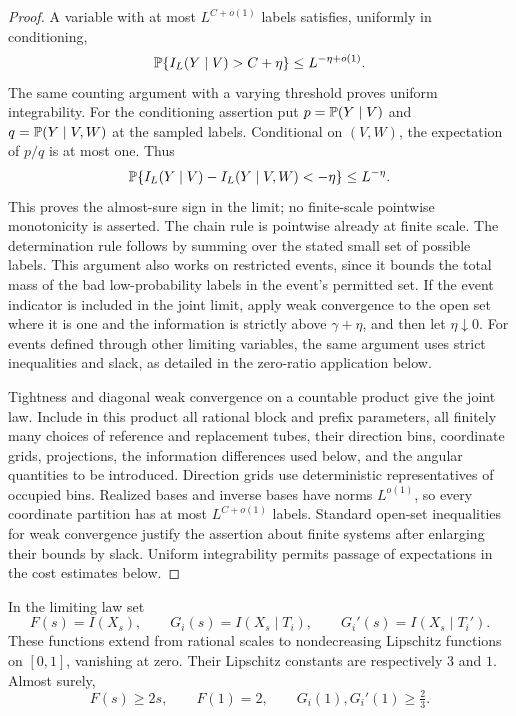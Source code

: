 \begin{proof}
A variable with at most $L^{C+o(1)}$ labels satisfies, uniformly in
conditioning,
\[
 \mathbb P\{I_L(Y\mid V)>C+\eta\}\le L^{-\eta+o(1)}.
\]
The same counting argument with a varying threshold proves uniform
integrability.  For the conditioning assertion put
$p=\mathbb P(Y\mid V)$ and $q=\mathbb P(Y\mid V,W)$ at the sampled labels.
Conditional on $(V,W)$, the expectation of $p/q$ is at most one.
Thus
\[
 \mathbb P\{I_L(Y\mid V)-I_L(Y\mid V,W)<-\eta\}
       \le L^{-\eta}.
\]
This proves the almost-sure sign in the limit; no finite-scale
pointwise monotonicity is asserted.  The chain rule is pointwise
already at finite scale.  The determination rule follows by summing
over the stated small set of possible labels.  This argument also
works on restricted events, since it bounds the total mass of the
bad low-probability labels in the event's permitted set.  If the
event indicator is included in the joint limit, apply weak convergence
to the open set where it is one and the information is strictly
above $\gamma+\eta$, and then let $\eta\downarrow0$.  For events
defined through other limiting variables, the same argument uses
strict inequalities and slack, as detailed in the zero-ratio
application below.

Tightness and diagonal weak convergence on a countable product give
the joint law.  Include in this product all rational block and prefix
parameters, all finitely many choices of reference and replacement
tubes, their direction bins, coordinate grids, projections, the
information differences used below, and the angular quantities to be
introduced.  Direction grids use deterministic representatives of
occupied bins.  Realized bases and inverse bases have norms
$L^{o(1)}$, so every coordinate partition has at most $L^{C+o(1)}$
labels.  Standard open-set inequalities for weak convergence justify
the assertion about finite systems after enlarging their bounds by
slack.  Uniform integrability permits passage of expectations in the
cost estimates below.
\end{proof}

\begin{lemma}\label{lem:transverse-profiles}
In the limiting law set
\[
 F(s)=I(X_s),\qquad G_i(s)=I(X_s\mid T_i),\qquad
 G_i'(s)=I(X_s\mid T_i').
\]
These functions extend from rational scales to nondecreasing Lipschitz
functions on $[0,1]$, vanishing at zero.  Their Lipschitz constants
are respectively $3$ and $1$.  Almost surely,
\begin{equation}\label{eq:transverse-endpoint-information}
 F(s)\ge2s,\qquad F(1)=2,\qquad
 G_i(1),G_i'(1)\ge\tfrac23.
\end{equation}
\end{lemma}

